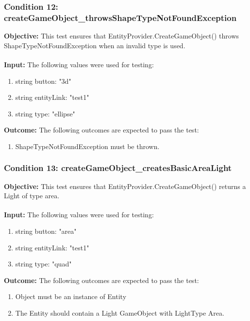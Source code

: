 \documentclass[a4paper,12pt]{article}
\begin{document}
		\subsubsection{Condition 12: createGameObject\_throwsShapeTypeNotFoundException}
			\textbf{Objective:} This test ensures that EntityProvider.CreateGameObject() throws ShapeTypeNotFoundException when an invalid type is used.\\\\
			\textbf{Input:} The following values were used for testing:
				\begin{enumerate}
					\item string button: "3d"
					\item string entityLink: "test1"
					\item string type: "ellipse"
				\end{enumerate}
			\textbf{Outcome:} The following outcomes are expected to pass the test:
				\begin{enumerate}
					\item ShapeTypeNotFoundException must be thrown.
				\end{enumerate}
		\subsubsection{Condition 13: createGameObject\_createsBasicAreaLight}
			\textbf{Objective:} This test ensures that EntityProvider.CreateGameObject() returns a Light of type area.\\\\
			\textbf{Input:} The following values were used for testing:
				\begin{enumerate}
					\item string button: "area"
					\item string entityLink: "test1"
					\item string type: "quad"
				\end{enumerate}
			\textbf{Outcome:} The following outcomes are expected to pass the test:
				\begin{enumerate}
					\item Object must be an instance of Entity
					\item The Entity should contain a Light GameObject with LightType Area.
				\end{enumerate}
\end{document}
